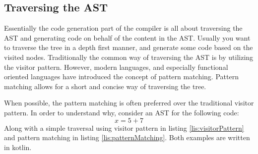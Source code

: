 
\subsection{Traversing the AST}
Essentially the code generation part of the compiler is all about traversing the AST and generating code on behalf of the content in the AST.
Usually you want to traverse the tree in a depth first manner, and generate some code based on the visited nodes.
Traditionally the common way of traversing the AST is by utilizing the visitor pattern. 
However, modern languages, and especially functional oriented languages have introduced the concept of pattern matching.
Pattern matching allows for a short and concise way of traversing the tree.

When possible, the pattern matching is often preferred over the traditional visitor pattern. 
In order to understand why, consider an AST for the following code:
$$x = 5 + 7$$
Along with a simple traversal using visitor pattern in listing \ref{lis:visitorPattern} and pattern matching in listing \ref{lis:patternMatching}. Both examples are written in kotlin.

